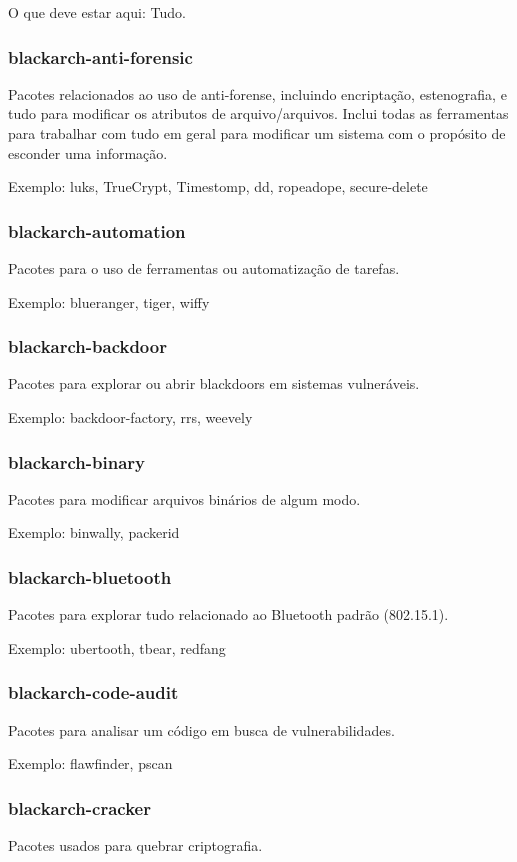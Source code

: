 \documentclass[a4paper, oneside, 11pt]{book}
\begin{document}
O que deve estar aqui: Tudo.

\subsubsection{blackarch-anti-forensic}
Pacotes relacionados ao uso de anti-forense, incluindo encriptação, estenografia, e tudo para modificar os atributos de arquivo/arquivos.
Inclui todas as ferramentas para trabalhar com tudo em geral para modificar um sistema com o propósito de esconder uma informação.

Exemplo: luks, TrueCrypt, Timestomp, dd, ropeadope, secure-delete

\subsubsection{blackarch-automation}
Pacotes para o uso de ferramentas ou automatização de tarefas.

Exemplo: blueranger, tiger, wiffy

\subsubsection{blackarch-backdoor}
Pacotes para explorar ou abrir blackdoors em sistemas vulneráveis.

Exemplo: backdoor-factory, rrs, weevely

\subsubsection{blackarch-binary}
Pacotes para modificar arquivos binários de algum modo.

Exemplo: binwally, packerid

\subsubsection{blackarch-bluetooth}
Pacotes para explorar tudo relacionado ao Bluetooth padrão (802.15.1).

Exemplo: ubertooth, tbear, redfang

\subsubsection{blackarch-code-audit}
Pacotes para analisar um código em busca de vulnerabilidades.

Exemplo: flawfinder, pscan

\subsubsection{blackarch-cracker}
Pacotes usados para quebrar criptografia.
\end{document}
